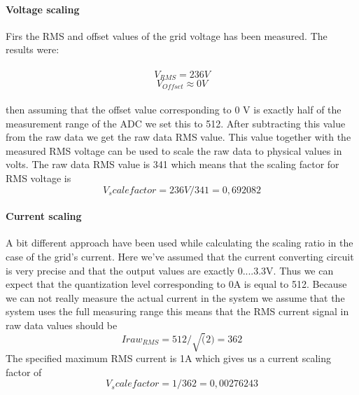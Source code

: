 \paragraph{Voltage scaling}
Firs the RMS and offset values of the grid voltage has been measured. The results were:\\\\ 
\[ V_{RMS}=236V \] 
\[ V_{Offset} \approx 0V\]\\
then assuming that the offset value corresponding to 0 V is exactly half of the measurement range of the ADC we set this to 512. After subtracting this value 
from the raw data we get the raw data RMS value. This value together with the measured RMS voltage can be used to scale the raw data to physical values in 
volts. The raw data RMS value is 341 which means that the scaling factor for RMS voltage is
\[ V_scalefactor= 236V/341=0,692082\]

\paragraph{Current scaling}
A bit different approach have been used while calculating the scaling ratio in the case of the grid's current. Here we've assumed that the current converting 
circuit is very precise and that the output values are exactly 0....3.3V. Thus we can expect that the quantization level corresponding to 0A is equal to 512. 
Because we can not really measure the actual current in the system we assume that the system uses the full measuring range this means that the RMS current 
signal in raw data values should be 
\[ Iraw_{RMS}=512/\sqrt(2)=362\]
The specified maximum RMS current is 1A which gives us a current scaling factor of  
\[ V_scalefactor= 1/362=0,00276243\]

